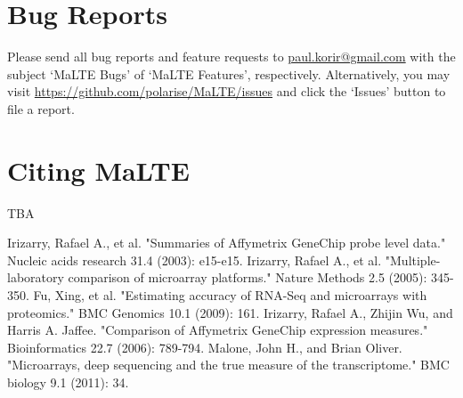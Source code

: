 \documentclass[a4paper,12pt]{article}
\begin{document}
\section{Bug Reports}
\label{bugs}
Please send all bug reports and feature requests to \href{mailto:paul.korir@gmail.com}{paul.korir@gmail.com} with the subject `MaLTE Bugs' of `MaLTE Features', respectively. Alternatively, you may visit \url{https://github.com/polarise/MaLTE/issues} and click the `Issues' button to file a report.

\section{Citing \textsf{MaLTE}}
TBA

\begin{thebibliography}{50}

 Irizarry, Rafael A., et al. "Summaries of Affymetrix GeneChip probe level data." Nucleic acids research 31.4 (2003): e15-e15.
 Irizarry, Rafael A., et al. "Multiple-laboratory comparison of microarray platforms." Nature Methods 2.5 (2005): 345-350.
 Fu, Xing, et al. "Estimating accuracy of RNA-Seq and microarrays with proteomics." BMC Genomics 10.1 (2009): 161.
 Irizarry, Rafael A., Zhijin Wu, and Harris A. Jaffee. "Comparison of Affymetrix GeneChip expression measures." Bioinformatics 22.7 (2006): 789-794.
 Malone, John H., and Brian Oliver. "Microarrays, deep sequencing and the true measure of the transcriptome." BMC biology 9.1 (2011): 34.

\end{thebibliography}


\pagebreak
\appendix
\end{document}
